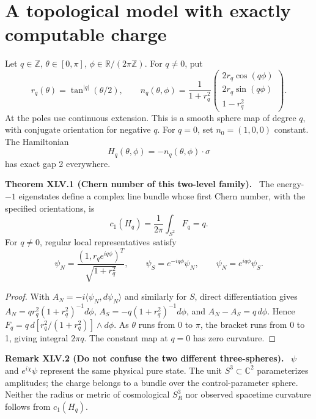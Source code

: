 \documentclass[11pt,a4paper,oneside]{book}
\newcommand{\R}{\mathbb R}\newcommand{\C}{\mathbb C}\newcommand{\Z}{\mathbb Z}\newcommand{\N}{\mathbb N}\newcommand{\Q}{\mathbb Q}
\newcommand{\statement}[3]{\par\medskip\noindent\textbf{#1 #2 (#3).}\ }
\begin{document}
\section{A topological model with exactly computable charge}
Let $q\in\Z$, $\theta\in[0,\pi]$, $\phi\in\R/(2\pi\Z)$. For $q\ne0$, put
\begin{equation}r_q(\theta)=\tan^{|q|}(\theta/2),\qquad n_q(\theta,\phi)=\frac1{1+r_q^2}\begin{pmatrix}2r_q\cos(q\phi)\\2r_q\sin(q\phi)\\1-r_q^2\end{pmatrix}.\tag{193}\end{equation}
At the poles use continuous extension. This is a smooth sphere map of degree $q$, with conjugate orientation for negative $q$. For $q=0$, set $n_0=(1,0,0)$ constant. The Hamiltonian
\begin{equation}H_q(\theta,\phi)=-n_q(\theta,\phi)\cdot\sigma\tag{194}\end{equation}
has exact gap 2 everywhere.
\statement{Theorem}{XLV.1}{Chern number of this two-level family}
The energy-$-1$ eigenstates define a complex line bundle whose first Chern number, with the specified orientations, is
\begin{equation}c_1(H_q)=\frac1{2\pi}\int_{S^2}F_q=q.\tag{195}\end{equation}
For $q\ne0$, regular local representatives satisfy
\[\psi_N=\frac{(1,r_qe^{iq\phi})^T}{\sqrt{1+r_q^2}},\qquad\psi_S=e^{-iq\phi}\psi_N,\qquad\psi_N=e^{iq\phi}\psi_S.\]
\begin{proof}
With $A_N=-i\langle\psi_N,d\psi_N\rangle$ and similarly for $S$, direct differentiation gives $A_N=qr_q^2(1+r_q^2)^{-1}d\phi$, $A_S=-q(1+r_q^2)^{-1}d\phi$, and $A_N-A_S=q\,d\phi$. Hence $F_q=q\,d[r_q^2/(1+r_q^2)]\wedge d\phi$. As $\theta$ runs from 0 to $\pi$, the bracket runs from 0 to 1, giving integral $2\pi q$. The constant map at $q=0$ has zero curvature.
\end{proof}
\statement{Remark}{XLV.2}{Do not confuse the two different three-spheres}
$\psi$ and $e^{i\chi}\psi$ represent the same physical pure state. The unit $S^3\subset\C^2$ parameterizes amplitudes; the charge belongs to a bundle over the control-parameter sphere. Neither the radius or metric of cosmological $S_R^3$ nor observed spacetime curvature follows from $c_1(H_q)$.
\end{document}
